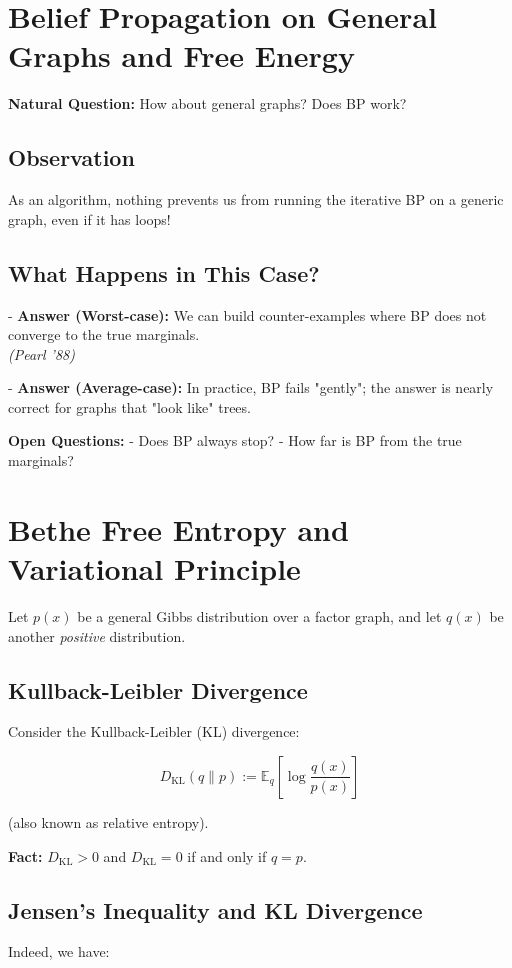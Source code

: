 \documentclass{article}%
\begin{document}
\section*{Belief Propagation on General Graphs and Free Energy}

\textbf{Natural Question:} How about general graphs? Does BP work?

\subsection*{Observation}
As an algorithm, nothing prevents us from running the iterative BP on a generic graph, even if it has loops!

\subsection*{What Happens in This Case?}

- \textbf{Answer (Worst-case):} We can build counter-examples where BP does not converge to the true marginals. \\ 
  \textit{(Pearl '88)}

- \textbf{Answer (Average-case):} In practice, BP fails "gently"; the answer is nearly correct for graphs that "look like" trees.

\textbf{Open Questions:}
- Does BP always stop?
- How far is BP from the true marginals?



\section*{Bethe Free Entropy and Variational Principle}

Let \( p(x) \) be a general Gibbs distribution over a factor graph, and let \( q(x) \) be another \textit{positive} distribution.

\subsection*{Kullback-Leibler Divergence}
Consider the Kullback-Leibler (KL) divergence:

\[
D_{\text{KL}}(q \| p) := \mathbb{E}_q \left[ \log \frac{q(x)}{p(x)} \right]
\]

(also known as relative entropy).

\textbf{Fact:} \( D_{\text{KL}} > 0 \) and \( D_{\text{KL}} = 0 \) if and only if \( q = p \).

\subsection*{Jensen's Inequality and KL Divergence}
Indeed, we have:
\end{document}
